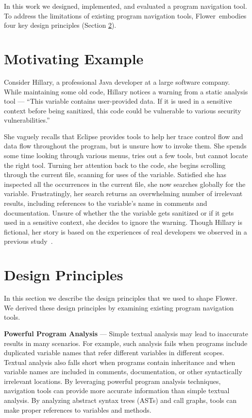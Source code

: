 \documentclass[conference]{IEEEtran}
\newcommand{\toolName}{Flower}
\begin{document}
In this work we designed, implemented, and evaluated a program navigation tool.
To address the limitations of existing program navigation tools, \toolName~embodies four key design principles (Section \ref{DesignPrinciples}).

\section{Motivating Example}
Consider Hillary, a professional Java developer at a large software company.
While maintaining some old code, Hillary notices a warning from a static analysis tool --- ``This variable contains user-provided data. If it is used in a sensitive context before being sanitized, this code could be vulnerable to various security vulnerabilities.''

She vaguely recalls that Eclipse provides tools to help her trace control flow and data flow throughout the program, but is unsure how to invoke them.
She spends some time looking through various menus, tries out a few tools, but cannot locate the right tool.
Turning her attention back to the code, she begins scrolling through the current file, scanning for uses of the variable. 
Satisfied she has inspected all the occurrences in the current file, she now searches globally for the variable.
Frustratingly, her search returns an overwhelming number of irrelevant results, including references to the variable's name in comments and documentation.
Unsure of whether the the variable gets sanitized or if it gets used in a sensitive context, she decides to ignore the warning.
Though Hillary is fictional, her story is based on the experiences of real developers we observed in a previous study~\cite{Smith2015}.
\section{Design Principles}
\label{DesignPrinciples}
In this section we describe the design principles that we used to shape \toolName. We derived these design principles by examining existing program navigation tools.
 
\vspace{1em} 
\noindent\textbf{Powerful Program Analysis} ---
Simple textual analysis may lead to inaccurate results in many scenarios. For example, such analysis fails when programs include duplicated variable names that refer different variables in different scopes. Textual analysis also falls short when programs contain inheritance and when variable names are included in comments, documentation, or other syntactically irrelevant locations.
By leveraging powerful program analysis techniques, navigation tools can provide more accurate information than simple textual analysis.
By analyzing abstract syntax trees (ASTs) and call graphs, tools can make proper references to variables and methods. 
\end{document}
